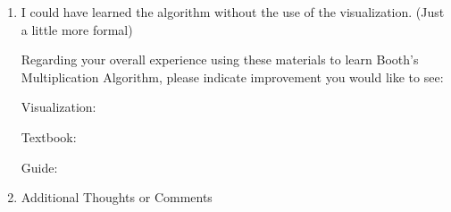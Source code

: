 \documentclass{article}
\begin{document}
\begin{enumerate}
\item I could have learned the algorithm without the use of the visualization.
(Just a little more formal)



Regarding your overall experience using these materials to learn Booth's Multiplication Algorithm, please indicate improvement you would like to see:

  Visualization:

  Textbook:

  Guide:

\item Additional Thoughts or Comments

\end{enumerate}
\end{document}
